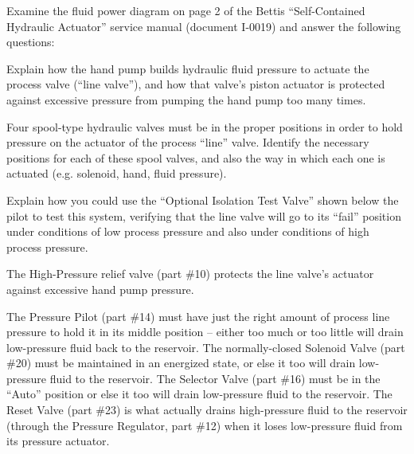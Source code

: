 

Examine the fluid power diagram on page 2 of the Bettis ``Self-Contained Hydraulic Actuator'' service manual (document I-0019) and answer the following questions:

\vskip 10pt

Explain how the hand pump builds hydraulic fluid pressure to actuate the process valve (``line valve''), and how that valve's piston actuator is protected against excessive pressure from pumping the hand pump too many times.

\vskip 10pt

Four spool-type hydraulic valves must be in the proper positions in order to hold pressure on the actuator of the process ``line'' valve.  Identify the necessary positions for each of these spool valves, and also the way in which each one is actuated (e.g. solenoid, hand, fluid pressure).

\vskip 10pt

Explain how you could use the ``Optional Isolation Test Valve'' shown below the pilot to test this system, verifying that the line valve will go to its ``fail'' position under conditions of low process pressure and also under conditions of high process pressure.













The High-Pressure relief valve (part \#10) protects the line valve's actuator against excessive hand pump pressure.

\vskip 10pt

The Pressure Pilot (part \#14) must have just the right amount of process line pressure to hold it in its middle position -- either too much or too little will drain low-pressure fluid back to the reservoir.  The normally-closed Solenoid Valve (part \#20) must be maintained in an energized state, or else it too will drain low-pressure fluid to the reservoir.  The Selector Valve (part \#16) must be in the ``Auto'' position or else it too will drain low-pressure fluid to the reservoir.  The Reset Valve (part \#23) is what actually drains high-pressure fluid to the reservoir (through the Pressure Regulator, part \#12) when it loses low-pressure fluid from its pressure actuator.

